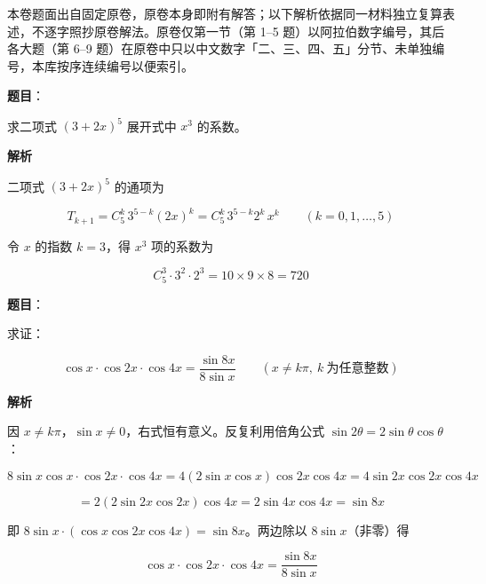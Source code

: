 

\begin{gktip}
本卷题面出自固定原卷，原卷本身即附有解答；以下解析依据同一材料独立复算表述，不逐字照抄原卷解法。原卷仅第一节（第 1–5 题）以阿拉伯数字编号，其后各大题（第 6–9 题）在原卷中只以中文数字「二、三、四、五」分节、未单独编号，本库按序连续编号以便索引。
\end{gktip}


\begin{answer}

\textbf{题目}：

求二项式 $(3+2x)^5$ 展开式中 $x^3$ 的系数。

\textbf{解析}

二项式 $(3+2x)^5$ 的通项为

\nopagebreak[4]
\[
T_{k+1}=C_5^k\,3^{5-k}(2x)^k=C_5^k\,3^{5-k}2^k\,x^k\qquad(k=0,1,\dots,5)
\]

令 $x$ 的指数 $k=3$，得 $x^3$ 项的系数为

\nopagebreak[4]
\[
C_5^3\cdot3^2\cdot2^3=10\times9\times8=720
\]


\end{answer}
\begin{answer}

\textbf{题目}：

求证：

\nopagebreak[4]
\[
\cos x\cdot\cos 2x\cdot\cos 4x=\frac{\sin 8x}{8\sin x}\qquad(x\ne k\pi,\ k\ \text{为任意整数})
\]

\textbf{解析}

因 $x\ne k\pi$，$\sin x\ne0$，右式恒有意义。反复利用倍角公式 $\sin2\theta=2\sin\theta\cos\theta$：

\nopagebreak[4]
\[
8\sin x\cos x\cdot\cos2x\cdot\cos4x
=4(2\sin x\cos x)\cos2x\cos4x
=4\sin2x\cos2x\cos4x
\]

\nopagebreak[4]
\[
=2(2\sin2x\cos2x)\cos4x=2\sin4x\cos4x=\sin8x
\]

即 $8\sin x\cdot(\cos x\cos2x\cos4x)=\sin8x$。两边除以 $8\sin x$（非零）得

\nopagebreak[4]
\[
\cos x\cdot\cos2x\cdot\cos4x=\frac{\sin8x}{8\sin x}
\]


\end{answer}
